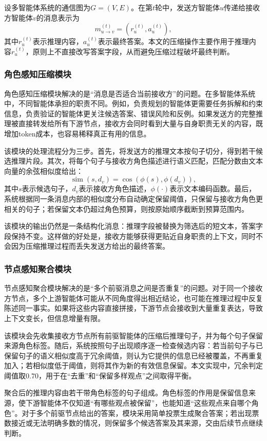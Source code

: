 设多智能体系统的通信图为$G=(V,E)$。在第$t$轮中，发送方智能体$u$传递给接收方智能体$v$的消息表示为
$$
m_{u\rightarrow v}^{(t)}=(r_u^{(t)},a_u^{(t)}),
$$
其中$r_u^{(t)}$表示推理内容，$a_u^{(t)}$表示最终答案。本文的压缩操作主要作用于推理内容$r_u^{(t)}$，原则上不直接改写答案字段，从而避免压缩过程破坏最终判断。

\subsubsection{角色感知压缩模块}

角色感知压缩模块解决的是“消息是否适合当前接收方”的问题。在多智能体系统中，不同智能体承担的职责不同。例如，负责规划的智能体更需要任务拆解和约束信息，负责验证的智能体更关注候选答案、错误风险和反例。如果发送方的完整推理被直接转发给所有下游节点，接收方会同时看到大量与自身职责无关的内容，既增加token成本，也容易稀释真正有用的信息。

该模块的处理流程分为三步。首先，将发送方的推理文本按句子切分，得到若干候选推理片段。其次，将每个句子与接收方角色描述进行语义匹配，匹配分数由文本向量的余弦相似度给出：
$$
\operatorname{sim}(s,d_v)=\cos(\phi(s),\phi(d_v)),
$$
其中$s$表示候选句子，$d_v$表示接收方角色描述，$\phi(\cdot)$表示文本编码函数。最后，系统根据同一条消息内部的相似度分布自动确定保留阈值，只保留与接收方角色更相关的句子；若保留文本仍超过角色预算，则按原始顺序截断到预算范围内。

该模块的输出仍然是一条结构化消息：推理字段被替换为筛选后的短文本，答案字段保持不变。这样做的好处是，接收方能够获得更贴近自身职责的上下文，同时不会因为压缩推理过程而丢失发送方给出的最终答案。

\subsubsection{节点感知聚合模块}

节点感知聚合模块解决的是“多个前驱消息之间是否重复”的问题。对于同一个接收方节点，多个上游智能体可能从不同角度得出相近结论，也可能在推理过程中反复陈述同一事实。如果将这些内容直接拼接，下游节点会接收到大量重复表达，导致上下文变长，但信息增量有限。

该模块会先收集接收方节点所有前驱智能体的压缩后推理句子，并为每个句子保留来源角色标签。随后，系统按照句子出现顺序逐一检查候选内容：若当前句子与已保留句子的语义相似度高于冗余阈值，则认为它提供的信息已经被覆盖，不再重复加入；若相似度低于阈值，则将其作为新的有效信息保留。本文实现中，冗余判定阈值取$0.70$，用于在“去重”和“保留多样观点”之间取得平衡。

聚合后的推理内容由若干带角色标签的句子组成。角色标签的作用是保留信息来源，使下游智能体不仅知道“有哪些观点被保留”，也能知道“这些观点来自哪个角色”。对于多个前驱节点给出的答案，模块采用简单投票生成聚合答案；若出现票数接近或无法明确多数的情况，则保留多个候选答案及其来源，交由后续节点继续判断。

